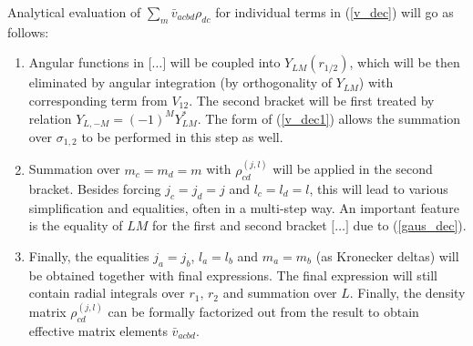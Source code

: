 \documentclass[10pt,a4paper]{article}
\begin{document}
Analytical evaluation of $\sum_{m}\bar{v}_{acbd}\rho_{dc}$ for individual terms in (\ref{v_dec}) will go as follows:
\begin{enumerate}
\item Angular functions in $\big[\ldots\big]$ will be coupled into $Y_{LM}(r_{1/2})$, which will be then eliminated by angular integration (by orthogonality of $Y_{LM}$) with corresponding term from $V_{12}$. The second bracket will be first treated by relation $Y_{L,-M} = (-1)^M Y_{LM}^*$. The form of (\ref{v_dec1}) allows the summation over $\sigma_{1,2}$ to be performed in this step as well.
\item Summation over $m_c=m_d=m$ with $\rho_{cd}^{(j,l)}$ will be applied in the second bracket. Besides forcing $j_c=j_d=j$ and $l_c=l_d=l$, this will lead to various simplification and equalities, often in a multi-step way. An important feature is the equality of $LM$ for the first and second bracket $\big[\ldots\big]$ due to (\ref{gaus_dec}).
\item Finally, the equalities $j_a=j_b$, $l_a=l_b$ and $m_a=m_b$ (as Kronecker deltas) will be obtained together with final expressions. The final expression will still contain radial integrals over $r_1,\,r_2$ and summation over $L$. Finally, the density matrix $\rho_{cd}^{(j,l)}$ can be formally factorized out from the result to obtain effective matrix elements $\bar{v}_{acbd}$.
\end{enumerate}
\end{document}
